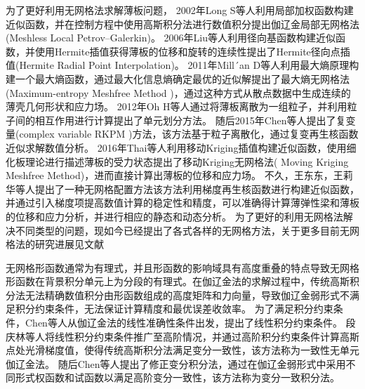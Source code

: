 为了更好利用无网格法求解薄板问题，
2002年Long S等人\textsuperscript{\cite{long2002}}利用局部加权函数构建近似函数，并在控制方程中使用高斯积分法进行数值积分提出伽辽金局部无网格法(Meshless Local Petrov–Galerkin)。
2006年Liu等人\textsuperscript{\cite{liu2006}}利用径向基函数构建近似函数，并使用Hermite插值获得薄板的位移和旋转的连续性提出了Hermite径向点插值(Hermite Radial Point Interpolation)。
2011年Mill´an D等人\textsuperscript{\cite{millan2011}}利用最大熵原理构建一个最大熵函数，通过最大化信息熵确定最优的近似解提出了最大熵无网格法(Maximum-entropy Meshfree  Method )，通过这种方式从散点数据中生成连续的薄壳几何形状和应力场。
2012年Oh H等人\textsuperscript{\cite{oh2012}}通过将薄板离散为一组粒子，并利用粒子间的相互作用进行计算提出了单元划分方法。
随后2015年Chen等人\textsuperscript{\cite{chen2015}}提出了复变量(complex variable RKPM )方法，该方法基于粒子离散化，通过复变再生核函数近似求解数值分析。
2016年Thai等人\textsuperscript{\cite{thai2016}}利用移动Kriging插值构建近似函数，使用细化板理论进行描述薄板的受力状态提出了移动Kriging无网格法( Moving Kriging Meshfree Method)，进而直接计算出薄板的位移和应力场。
不久，王东东，王莉华等人\textsuperscript{\cite{wang2020,wang2021}}提出了一种无网格配置方法该方法利用梯度再生核函数进行构建近似函数，并通过引入梯度项提高数值计算的稳定性和精度，可以准确得计算薄弹性梁和薄板的位移和应力分析，并进行相应的静态和动态分析。
为了更好的利用无网格法解决不同类型的问题，现如今已经提出了各式各样的无网格方法\textsuperscript{\cite{ChengYuMin2005,TanXianYun2011,LianYanPing2013,ZhangXiong2017,GaoXiaoWei2019}}，关于更多目前无网格法的研究进展见文献\textsuperscript{\cite{nguyen2008,liu2009,张雄2009无网格法的理论及应用,wang2014,yreux2017,koester2019,rohit2018,王莉华2021配点型无网格法理论和研究进展,LiuYuXiang2021,朱志辉2021基于,sriram2021,ChenJian2022,LiYuDong2022}}
\par
无网格形函数通常为有理式，并且形函数的影响域具有高度重叠的特点导致无网格形函数在背景积分单元上为分段的有理式。在伽辽金法的求解过程中，传统高斯积分法无法精确数值积分由形函数组成的高度矩阵和力向量，导致伽辽金弱形式不满足积分约束条件，无法保证计算精度和最优误差收敛率。
为了满足积分约束条件，Chen等人从伽辽金法的线性准确性条件出发，提出了线性积分约束条件\textsuperscript{\cite{chen2001}}。
段庆林等人\textsuperscript{\cite{陈嵩涛2020几何非线性分析的高效高阶无网格法,duan2012}}将线性积分约束条件推广至高阶情况，并通过高阶积分约束条件计算高斯点处光滑梯度值，使得传统高斯积分法满足变分一致性，该方法称为一致性无单元伽辽金法。
随后Chen等人\textsuperscript{\cite{chen1996}}提出了修正变分积分法，通过在伽辽金弱形式中采用不同形式权函数和试函数以满足高阶变分一致性，该方法称为变分一致积分法。
